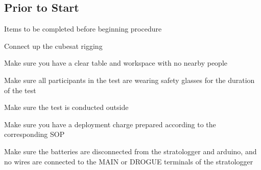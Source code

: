 \subsection{Prior to Start}
\begin{checklist}
    \item Items to be completed before beginning procedure
    \begin{checklist}
        \item Connect up the cubesat rigging
        \item Make sure you have a clear table and workspace with no nearby people
	\item Make sure all participants in the test are wearing safety glasses for the duration of the test
	\item Make sure the test is conducted outside
	\item Make sure you have a deployment charge prepared according to the corresponding SOP
        \item Make sure the batteries are disconnected from the stratologger and arduino, and no wires are connected to the MAIN or DROGUE terminals of the stratologger
    \end{checklist}
\end{checklist}
\setcounter{checklistnum}{0}

\newpage
